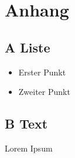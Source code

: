 \chapter*{Anhang}
\label{sec:anhang}

\section*{A Liste}
\begin{itemize}
   	 \item{Erster Punkt}
   	 \item{Zweiter Punkt}
\end{itemize}

\section*{B Text}
Lorem Ipsum 